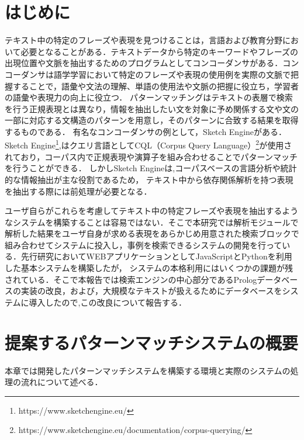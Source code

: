 \documentclass{FITpaper}
\begin{document}
\maketitle

\section{はじめに}
テキスト中の特定のフレーズや表現を見つけることは，言語および教育分野において必要となることがある．テキストデータから特定のキーワードやフレーズの出現位置や文脈を抽出するためのプログラムとしてコンコーダンサがある．コンコーダンサは語学学習において特定のフレーズや表現の使用例を実際の文脈で把握することで，語彙や文法の理解、単語の使用法や文脈の把握に役立ち，学習者の語彙や表現力の向上に役立つ．
パターンマッチングはテキストの表層で検索を行う正規表現とは異なり，情報を抽出したい文を対象に予め関係する文や文の一部に対応する文構造のパターンを用意し，そのパターンに合致する結果を取得するものである．
有名なコンコーダンサの例として，Sketch Engineがある．Sketch Engine\footnote{https://www.sketchengine.eu/},はクエリ言語としてCQL（Corpus Query Language）\footnote{https://www.sketchengine.eu/documentation/corpus-querying/}が使用されており，コーパス内で正規表現や演算子を組み合わせることでパターンマッチを行うことができる．
しかしSketch Engineは,コーパスベースの言語分析や統計的な情報抽出が主な役割であるため，
テキスト中から依存関係解析を持つ表現を抽出する際には前処理が必要となる．

ユーザ自らがこれらを考慮してテキスト中の特定フレーズや表現を抽出するようなシステムを構築することは容易ではない．そこで本研究では解析モジュールで解析した結果をユーザ自身が求める表現をあらかじめ用意された検索ブロックで組み合わせてシステムに投入し，事例を検索できるシステムの開発を行っている．先行研究においてWEBアプリケーションとしてJavaScriptとPythonを利用した基本システムを構築したが，
システムの本格利用にはいくつかの課題が残されている．そこで本報告では検索エンジンの中心部分であるPrologデータベースの実装の改良，および，大規模なテキストが扱えるためにデータベースをシステムに導入したので,この改良について報告する．


\section{提案するパターンマッチシステムの概要}
本章では開発したパターンマッチシステムを構築する環境と実際のシステムの処理の流れについて述べる．
\end{document}
